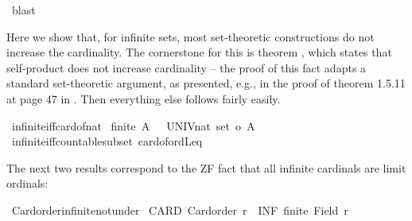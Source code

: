 \begin{isabellebody}
\ blast%
\endisatagproof
{\isafoldproof}%
%
\isadelimproof
%
\endisadelimproof
%
\isadelimdocument
%
\endisadelimdocument
%
\isatagdocument
%
\isamarkuptrue%
%
\endisatagdocument
{\isafolddocument}%
%
\isadelimdocument
%
\endisadelimdocument
%
\begin{isamarkuptext}%
Here we show that, for infinite sets, most set-theoretic constructions
do not increase the cardinality.  The cornerstone for this is
theorem , which states that self-product
does not increase cardinality -- the proof of this fact adapts a standard
set-theoretic argument, as presented, e.g., in the proof of theorem 1.5.11
at page 47 in \cite{card-book}. Then everything else follows fairly easily.%
\end{isamarkuptext}\isamarkuptrue%
\isamarkupfalse%
\ infinite{\isacharunderscore}{\kern0pt}iff{\isacharunderscore}{\kern0pt}card{\isacharunderscore}{\kern0pt}of{\isacharunderscore}{\kern0pt}nat{\isacharcolon}{\kern0pt}\isanewline
{\isachardoublequoteopen}{\isasymnot}\ finite\ A\ {\isasymlongleftrightarrow}\ {\isacharparenleft}{\kern0pt}\ {\isacharbar}{\kern0pt}UNIV{\isacharcolon}{\kern0pt}{\isacharcolon}{\kern0pt}nat\ set{\isacharbar}{\kern0pt}\ {\isasymle}o\ {\isacharbar}{\kern0pt}A{\isacharbar}{\kern0pt}\ {\isacharparenright}{\kern0pt}{\isachardoublequoteclose}\isanewline
%
\isadelimproof
%
\endisadelimproof
%
\isatagproof
{}\isamarkupfalse%
\ infinite{\isacharunderscore}{\kern0pt}iff{\isacharunderscore}{\kern0pt}countable{\isacharunderscore}{\kern0pt}subset\ card{\isacharunderscore}{\kern0pt}of{\isacharunderscore}{\kern0pt}ordLeq\ \isacommand{{\isachardot}{\kern0pt}{\isachardot}{\kern0pt}}\isamarkupfalse%
%
\endisatagproof
{\isafoldproof}%
%
\isadelimproof
%
\endisadelimproof
%
\begin{isamarkuptext}%
The next two results correspond to the ZF fact that all infinite cardinals are
limit ordinals:%
\end{isamarkuptext}\isamarkuptrue%
\isamarkupfalse%
\ Card{\isacharunderscore}{\kern0pt}order{\isacharunderscore}{\kern0pt}infinite{\isacharunderscore}{\kern0pt}not{\isacharunderscore}{\kern0pt}under{\isacharcolon}{\kern0pt}\isanewline
{}\ CARD{\isacharcolon}{\kern0pt}\ {\isachardoublequoteopen}Card{\isacharunderscore}{\kern0pt}order\ r{\isachardoublequoteclose}\ \ INF{\isacharcolon}{\kern0pt}\ {\isachardoublequoteopen}{\isasymnot}finite\ {\isacharparenleft}{\kern0pt}Field\ r{\isacharparenright}{\kern0pt}{\isachardoublequoteclose}\isanewline

\end{isabellebody}

